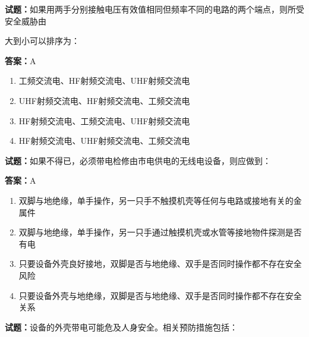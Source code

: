 \documentclass{ctexbook}
\begin{document}
\vspace{1em}

\textbf{试题：}如果用两手分别接触电压有效值相同但频率不同的电路的两个端点，则所受安全威胁由


大到小可以排序为： 

\textbf{答案：}A 

\begin{enumerate}[leftmargin=3em]
  \item 工频交流电、HF射频交流电、UHF射频交流电 

  \item UHF射频交流电、HF射频交流电、工频交流电 

  \item HF射频交流电、工频交流电、UHF射频交流电 

  \item HF射频交流电、UHF射频交流电、工频交流电 

\end{enumerate}





\vspace{1em}

\textbf{试题：}如果不得已，必须带电检修由市电供电的无线电设备，则应做到： 

\textbf{答案：}A 

\begin{enumerate}[leftmargin=3em]
  \item 双脚与地绝缘，单手操作，另一只手不触摸机壳等任何与电路或接地有关的金属件 

  \item 双脚与地绝缘，单手操作，另一只手通过触摸机壳或水管等接地物件探测是否有电 

  \item 只要设备外壳良好接地，双脚是否与地绝缘、双手是否同时操作都不存在安全风险 

  \item 只要设备外壳与地绝缘，双脚是否与地绝缘、双手是否同时操作都不存在安全关系 

\end{enumerate}





\vspace{1em}

\textbf{试题：}设备的外壳带电可能危及人身安全。相关预防措施包括： 
\end{document}
